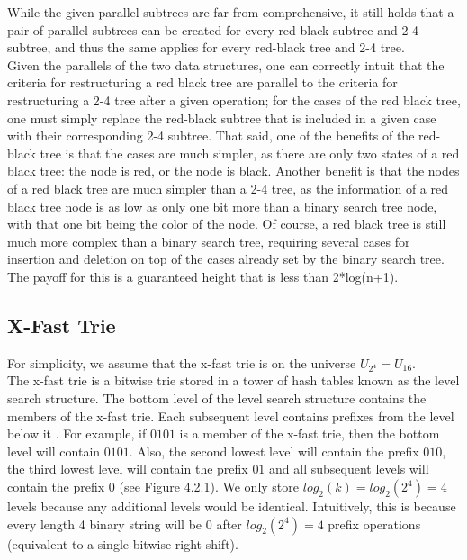 \documentclass{article}
\begin{document}
\noindent
While the given parallel subtrees are far from comprehensive, it still holds that a pair of parallel subtrees can be created for every red-black subtree and 2-4 subtree, and thus the same applies for every red-black tree and 2-4 tree.
\\

\noindent
Given the parallels of the two data structures, one can correctly intuit that the criteria for restructuring a red black tree are parallel to the criteria for restructuring a 2-4 tree after a given operation; for the cases of the red black tree, one must simply replace the red-black subtree that is included in a given case with their corresponding 2-4 subtree. That said, one of the benefits of the red-black tree is that the cases are much simpler, as there are only two states of a red black tree: the node is red, or the node is black. Another benefit is that the nodes of  a red black tree are much simpler than a 2-4 tree, as the information of a red black tree node is as low as only one bit more than a binary search tree node, with that one bit being the color of the node. Of course, a red black tree is still much more complex than a binary search tree, requiring several cases for insertion and deletion on top of the cases already set by the binary search tree. The payoff for this is a guaranteed height that is less than 2*log(n+1).
\\

\subsection{X-Fast Trie}

\noindent
For simplicity, we assume that the x-fast trie is on the universe ${U_{2^4} = U_{16}}$. 
\\

\noindent
The x-fast trie is a bitwise trie stored in a tower of hash tables known as the level search structure.  
The bottom level of the level search structure contains the members of the x-fast trie. Each subsequent level contains prefixes from the level below it \cite{WILLARD198381}. For example, if $0101$ is a member of the x-fast trie, then the bottom level will contain $0101$. Also, the second lowest level will contain the prefix $010$, the third lowest level will contain the prefix $01$ and all subsequent levels will contain the prefix $0$ (see Figure 4.2.1). We only store $log_2(k) = log_2(2^4) = 4$ levels because any additional levels would be identical. Intuitively, this is because every length 4 binary string will be $0$ after $log_2(2^4) = 4$ prefix operations (equivalent to a single bitwise right shift).
\end{document}

